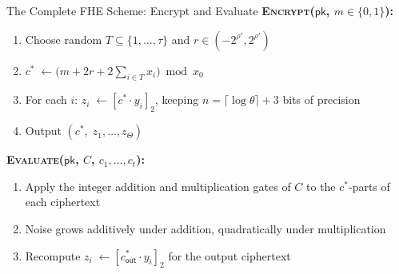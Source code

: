 \documentclass[10pt,handout]{beamer}
\begin{document}
\begin{frame}{The Complete FHE Scheme: Encrypt and Evaluate}
    \textbf{\textsc{Encrypt}($\mathsf{pk}$,\; $m \in \{0,1\}$):}
    \begin{enumerate}
        \item Choose random $T \subseteq \{1,\ldots,\tau\}$
              and $r \in (-2^{\rho'}, 2^{\rho'})$
        \item $c^* \;\leftarrow \bigl(m + 2r + 2\sum_{i\in T} x_i\bigr)
              \bmod x_0$
        \item For each $i$:\; $z_i \;\leftarrow [c^* \cdot y_i]_2$,
              keeping $n = \lceil\log\theta\rceil + 3$ bits of precision
        \item Output $(c^*,\; z_1, \ldots, z_\Theta)$
    \end{enumerate}

    \vspace{0.4cm}
    \textbf{\textsc{Evaluate}($\mathsf{pk}$,\; $C$,\; $c_1,\ldots,c_t$):}
    \begin{enumerate}
        \item Apply the integer addition and multiplication gates of $C$
              to the $c^*$-parts of each ciphertext
        \item Noise grows additively under addition, quadratically under
              multiplication
        \item Recompute $z_i \;\leftarrow [c^*_\mathsf{out} \cdot y_i]_2$
              for the output ciphertext
    \end{enumerate}
\end{frame}
\end{document}
